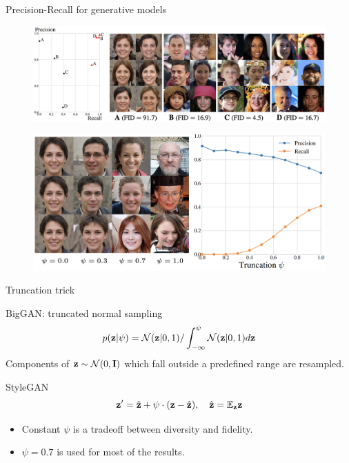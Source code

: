 \begin{frame}{Precision-Recall for generative models}
	\begin{figure}
		\includegraphics[width=\linewidth]{figs/pr_vs_fid}
	\end{figure}
	\begin{figure}
		\includegraphics[width=0.75\linewidth]{figs/pr_truncation}
	\end{figure}
\end{frame}
\begin{frame}{Truncation trick}
	\begin{block}{BigGAN: truncated normal sampling}
		\vspace{-0.3cm}
		\[
			p(\mathbf{z} | \psi) = \mathcal{N}(\mathbf{z} | 0, 1) / \int_{-\infty}^\psi \mathcal{N}(\mathbf{z} | 0, 1) d\mathbf{z}
		\]
		Components of $\mathbf{z} \sim \mathcal{N}(0, \mathbf{I})$ which fall outside a predefined range are resampled.
	\end{block}
	
	\begin{block}{StyleGAN}
		\vspace{-0.2cm}
		\[
			\mathbf{z}' = \hat{\mathbf{z}} + \psi \cdot (\mathbf{z} - \hat{\mathbf{z}}), \quad \hat{\mathbf{z}} = \mathbb{E}_{\mathbf{z}} \mathbf{z}
		\]
		\vspace{-0.2cm}
		\begin{itemize}
			\item Constant $\psi$ is a tradeoff between diversity and fidelity. 
			\item $\psi=0.7$ is used for most of the results.
		\end{itemize}
	\end{block}

\end{frame}

